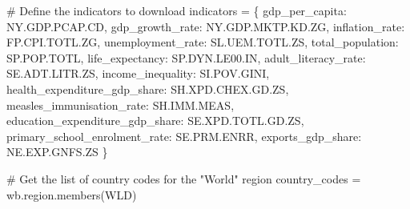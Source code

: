 \documentclass[
  letterpaper,
  DIV=11,
  numbers=noendperiod]{scrartcl}
\newenvironment{Shaded}{\begin{snugshade}}{\end{snugshade}}
\newcommand{\CommentTok}[1]{\textcolor[rgb]{0.37,0.37,0.37}{#1}}
\newcommand{\NormalTok}[1]{\textcolor[rgb]{0.00,0.23,0.31}{#1}}
\newcommand{\OperatorTok}[1]{\textcolor[rgb]{0.37,0.37,0.37}{#1}}
\newcommand{\StringTok}[1]{\textcolor[rgb]{0.13,0.47,0.30}{#1}}
\begin{document}
\begin{Shaded}
\begin{Highlighting}[]
\CommentTok{\# Define the indicators to download}
\NormalTok{indicators }\OperatorTok{=}\NormalTok{ \{}
    \StringTok{\textquotesingle{}gdp\_per\_capita\textquotesingle{}}\NormalTok{: }\StringTok{\textquotesingle{}NY.GDP.PCAP.CD\textquotesingle{}}\NormalTok{,}
    \StringTok{\textquotesingle{}gdp\_growth\_rate\textquotesingle{}}\NormalTok{: }\StringTok{\textquotesingle{}NY.GDP.MKTP.KD.ZG\textquotesingle{}}\NormalTok{,}
    \StringTok{\textquotesingle{}inflation\_rate\textquotesingle{}}\NormalTok{: }\StringTok{\textquotesingle{}FP.CPI.TOTL.ZG\textquotesingle{}}\NormalTok{,}
    \StringTok{\textquotesingle{}unemployment\_rate\textquotesingle{}}\NormalTok{: }\StringTok{\textquotesingle{}SL.UEM.TOTL.ZS\textquotesingle{}}\NormalTok{,}
    \StringTok{\textquotesingle{}total\_population\textquotesingle{}}\NormalTok{: }\StringTok{\textquotesingle{}SP.POP.TOTL\textquotesingle{}}\NormalTok{,}
    \StringTok{\textquotesingle{}life\_expectancy\textquotesingle{}}\NormalTok{: }\StringTok{\textquotesingle{}SP.DYN.LE00.IN\textquotesingle{}}\NormalTok{,}
    \StringTok{\textquotesingle{}adult\_literacy\_rate\textquotesingle{}}\NormalTok{: }\StringTok{\textquotesingle{}SE.ADT.LITR.ZS\textquotesingle{}}\NormalTok{,}
    \StringTok{\textquotesingle{}income\_inequality\textquotesingle{}}\NormalTok{: }\StringTok{\textquotesingle{}SI.POV.GINI\textquotesingle{}}\NormalTok{,}
    \StringTok{\textquotesingle{}health\_expenditure\_gdp\_share\textquotesingle{}}\NormalTok{: }\StringTok{\textquotesingle{}SH.XPD.CHEX.GD.ZS\textquotesingle{}}\NormalTok{,}
    \StringTok{\textquotesingle{}measles\_immunisation\_rate\textquotesingle{}}\NormalTok{: }\StringTok{\textquotesingle{}SH.IMM.MEAS\textquotesingle{}}\NormalTok{,}
    \StringTok{\textquotesingle{}education\_expenditure\_gdp\_share\textquotesingle{}}\NormalTok{: }\StringTok{\textquotesingle{}SE.XPD.TOTL.GD.ZS\textquotesingle{}}\NormalTok{,}
    \StringTok{\textquotesingle{}primary\_school\_enrolment\_rate\textquotesingle{}}\NormalTok{: }\StringTok{\textquotesingle{}SE.PRM.ENRR\textquotesingle{}}\NormalTok{,}
    \StringTok{\textquotesingle{}exports\_gdp\_share\textquotesingle{}}\NormalTok{: }\StringTok{\textquotesingle{}NE.EXP.GNFS.ZS\textquotesingle{}}
\NormalTok{\}}

\CommentTok{\# Get the list of country codes for the "World" region}
\NormalTok{country\_codes }\OperatorTok{=}\NormalTok{ wb.region.members(}\StringTok{\textquotesingle{}WLD\textquotesingle{}}\NormalTok{)}


\end{Highlighting}
\end{Shaded}
\end{document}
